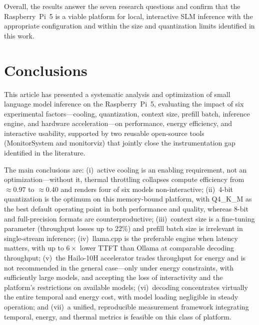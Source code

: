 \documentclass[acmsmall,natbib=false]{acmart}
\begin{document}
Overall, the results answer the seven research questions and confirm that
the Raspberry~Pi~5 is a viable platform for local, interactive SLM inference
with the appropriate configuration and within the size and quantization
limits identified in this work.

\section{Conclusions}\label{sec:conclusions}

This article has presented a systematic analysis and optimization of small
language model inference on the Raspberry~Pi~5, evaluating the impact of six
experimental factors---cooling, quantization, context size, prefill batch,
inference engine, and hardware acceleration---on performance, energy
efficiency, and interactive usability, supported by two reusable open-source
tools (MonitorSystem and monitorviz) that jointly close the instrumentation
gap identified in the literature.

The main conclusions are: (i)~active cooling is an enabling requirement, not
an optimization---without it, thermal throttling collapses compute
efficiency from ${\approx}0.97$ to ${\approx}0.40$ and renders four of six
models non-interactive; (ii)~4-bit quantization is the optimum on this
memory-bound platform, with Q4\_K\_M as the best default operating point in
both performance and quality, whereas 8-bit and full-precision formats are
counterproductive; (iii)~context size is a fine-tuning parameter (throughput
losses up to 22\%) and prefill batch size is irrelevant in single-stream
inference; (iv)~llama.cpp is the preferable engine when latency matters,
with up to $6\times$ lower TTFT than Ollama at comparable decoding
throughput; (v)~the Hailo-10H accelerator trades throughput for energy and is
not recommended in the general case---only under energy constraints, with
sufficiently large models, and accepting the loss of interactivity and the
platform's restrictions on available models;
(vi)~decoding concentrates virtually the entire temporal and energy cost,
with model loading negligible in steady operation; and (vii)~a unified,
reproducible measurement framework integrating temporal, energy, and thermal
metrics is feasible on this class of platform.
\end{document}
